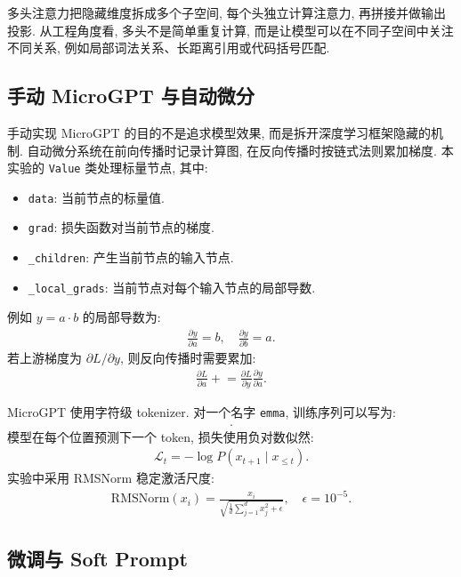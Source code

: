 \documentclass{../../nndlcourse}
\begin{document}
多头注意力把隐藏维度拆成多个子空间, 每个头独立计算注意力, 再拼接并做输出投影. 从工程角度看, 多头不是简单重复计算, 而是让模型可以在不同子空间中关注不同关系, 例如局部词法关系、长距离引用或代码括号匹配.

\subsection{手动 MicroGPT 与自动微分}

手动实现 MicroGPT 的目的不是追求模型效果, 而是拆开深度学习框架隐藏的机制. 自动微分系统在前向传播时记录计算图, 在反向传播时按链式法则累加梯度. 本实验的 \texttt{Value} 类处理标量节点, 其中:
\begin{itemize}
    \item \texttt{data}: 当前节点的标量值.
    \item \texttt{grad}: 损失函数对当前节点的梯度.
    \item \texttt{\_children}: 产生当前节点的输入节点.
    \item \texttt{\_local\_grads}: 当前节点对每个输入节点的局部导数.
\end{itemize}
例如 $y=a\cdot b$ 的局部导数为:
\begin{align}
    \frac{\partial y}{\partial a}=b,\quad
    \frac{\partial y}{\partial b}=a.
\end{align}
若上游梯度为 $\partial L/\partial y$, 则反向传播时需要累加:
\begin{align}
    \frac{\partial L}{\partial a}
    \mathrel{+}=
    \frac{\partial L}{\partial y}
    \frac{\partial y}{\partial a}.
\end{align}

MicroGPT 使用字符级 tokenizer. 对一个名字 \texttt{emma}, 训练序列可以写为:
\begin{align}
    [\texttt{BOS}, e, m, m, a, \texttt{BOS}].
\end{align}
模型在每个位置预测下一个 token, 损失使用负对数似然:
\begin{align}
    \mathcal{L}_t = -\log P(x_{t+1}\mid x_{\le t}).
\end{align}
实验中采用 RMSNorm 稳定激活尺度:
\begin{align}
    \mathrm{RMSNorm}(x_i)
    =
    \frac{x_i}{\sqrt{\frac{1}{d}\sum_{j=1}^{d}x_j^2+\epsilon}},
    \quad \epsilon=10^{-5}.
\end{align}

\subsection{微调与 Soft Prompt}
\end{document}
